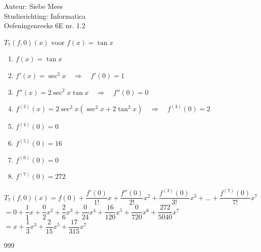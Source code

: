 \documentclass[a4paper]{article}
\begin{document}
  
\noindent \large Auteur: Siebe Mees \\
\noindent \large Studierichting: Informatica \\
\noindent \large Oefeningenreeks 6E nr. 1.2 \\

\medskip

\normalsize

$ T_7(f, 0) (x) $ voor $ f(x) = \tan x $ \\

\begin{enumerate}
  \item $f(x) = \tan x$
  \item $f'(x) = \sec^2 x \quad \Rightarrow \quad f'(0) = 1$
  \item $f''(x) = 2 \sec^2 x \tan x \quad \Rightarrow \quad f''(0) = 0$
  \item $f^{(3)}(x) = 2 \sec^2 x (\sec^2 x + 2 \tan^2 x) \quad \Rightarrow \quad f^{(3)}(0) = 2$
  \item $f^{(4)}(0) = 0$
  \item $f^{(5)}(0) = 16$
  \item $f^{(6)}(0) = 0$
  \item $f^{(7)}(0) = 272$
\end{enumerate}

$T_7(f, 0)(x) = f(0) + \dfrac{f'(0)}{1!}x + \dfrac{f''(0)}{2!}x^2 + \dfrac{f^{(3)}(0)}{3!}x^3 + ... + \dfrac{f^{(7)}(0)}{7!}x^7$ \\

$= 0 + \dfrac{1}{1}x + \dfrac{0}{2}x^2 + \dfrac{2}{6}x^3 + \dfrac{0}{24}x^4 + \dfrac{16}{120}x^5 + \dfrac{0}{720}x^6 + \dfrac{272}{5040}x^7$ \\

$ = x + \dfrac{1}{3}x^3 + \dfrac{2}{15}x^5 + \dfrac{17}{315}x^7$


\begin{thebibliography}{999}
\end{thebibliography}
\end{document}
